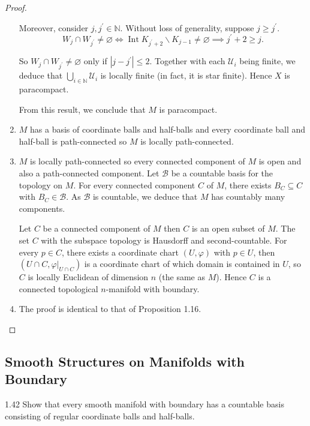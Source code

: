 \begin{proof}
\begin{enumerate}[itemsep=0pt,label={(\alph*)}]
              Moreover, consider \( j, j^{\prime} \in \mathbb{N} \). Without loss of generality, suppose \( j \ge j^{\prime} \).
              \[
                  W_{j} \cap W_{j^{\prime}} \ne \varnothing \iff \operatorname{Int} K_{j^{\prime} + 2} \smallsetminus K_{j-1} \ne \varnothing \implies j^{\prime} + 2 \ge j.
              \]

              So \( W_{j} \cap W_{j^{\prime}} \ne \varnothing \) only if \( \left\vert j - j^{\prime} \right\vert \le 2 \). Together with each \( \mathcal{U}_{i} \) being finite, we deduce that \( \bigcup_{i \in \mathbb{N}} \mathcal{U}_{i} \) is locally finite (in fact, it is star finite). Hence \( X \) is paracompact.

              From this result, we conclude that \( M \) is paracompact.
        \item \( M \) has a basis of coordinate balls and half-balls and every coordinate ball and half-ball is path-connected so \( M \) is locally path-connected.
        \item \( M \) is locally path-connected so every connected component of \( M \) is open and also a path-connected component. Let \( \mathcal{B} \) be a countable basis for the topology on \( M \). For every connected component \( C \) of \( M \), there exists \( B_{C} \subseteq C \) with \( B_{C} \in \mathcal{B} \). As \( \mathcal{B} \) is countable, we deduce that \( M \) has countably many components.

              Let \( C \) be a connected component of \( M \) then \( C \) is an open subset of \( M \). The set \( C \) with the subspace topology is Hausdorff and second-countable. For every \( p \in C \), there exists a coordinate chart \( (U, \varphi) \) with \( p \in U \), then \( (U \cap C, \varphi\vert_{U \cap C}) \) is a coordinate chart of which domain is contained in \( U \), so \( C \) is locally Euclidean of dimension \( n \) (the same as \( M \)). Hence \( C \) is a connected topological \(n\)-manifold with boundary.
        \item The proof is identical to that of Proposition 1.16.
    \end{enumerate}
\end{proof}

\subsection{Smooth Structures on Manifolds with Boundary}

\begin{exercise}{1.42}
    Show that every smooth manifold with boundary has a countable basis consisting of regular coordinate balls and half-balls.
\end{exercise}

